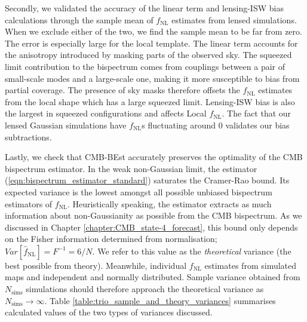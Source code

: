 Secondly, we validated the accuracy of the linear term and lensing-ISW bias calculations through the sample mean of $f_\text{NL}$ estimates from lensed simulations. When we exclude either of the two, we find the sample mean to be far from zero. The error is especially large for the local template. The linear term accounts for the anisotropy introduced by masking parts of the observed sky. The squeezed limit contribution to the bispectrum comes from couplings between a pair of small-scale modes and a large-scale one, making it more susceptible to bias from partial coverage. The presence of sky masks therefore offsets the $f_\text{NL}$ estimates from the local shape which has a large squeezed limit. Lensing-ISW bias is also the largest in squeezed configurations and affects Local $f_\text{NL}$. The fact that our lensed Gaussian simulations have $f_\text{NL}$s fluctuating around $0$ validates our bias subtractions.

Lastly, we check that CMB-BEst accurately preserves the optimality of the CMB bispectrum estimator. In the weak non-Gaussian limit, the estimator (\ref{eqn:bispectrum_estimator_standard}) saturates the Cramer-Rao bound. Its expected variance is the lowest amongst all possible unbiased bispectrum estimators of $f_\text{NL}$. Heuristically speaking, the estimator extracts as much information about non-Gaussianity as possible from the CMB bispectrum. As we discussed in Chapter \ref{chapter:CMB_state-4_forecast}, this bound only depends on the Fisher information determined from normalisation; $Var[\hat{f}_\text{NL}]=F^{-1}=6/N$. We refer to this value as the \textit{theoretical} variance (the best possible from theory). Meanwhile, individual $f_\text{NL}$ estimates from simulated maps and independent and normally distributed. Sample variance obtained from $N_\text{sims}$ simulations should therefore approach the theoretical variance as $N_\text{sims}\rightarrow\infty$. Table \ref{table:trio_sample_and_theory_variances} summarises calculated values of the two types of variances discussed.

